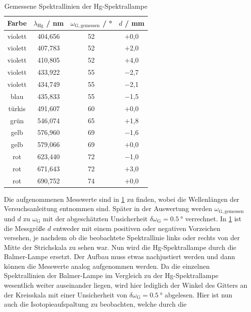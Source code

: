 \begin{table}[H]
    \centering
    \caption{Gemessene Spektrallinien der Hg-Spektrallampe}
    \begin{tabular}{c|c|c|c}
        Farbe & $\lambda_{\mathrm{Hg}}$ / \unit{\nano \meter} & $\omega_{\mathrm{G,gemessen}}$ / \unit{\degree} & $d$ / \unit{\milli \meter} \\
        \hline
        violett & 404,656 & 52 & $+$0,0 \\
        violett & 407,783 & 52 & $+$2,0 \\
        violett & 410,805 & 52 & $+$4,0 \\
        violett & 433,922 & 55 & $-$2,7 \\
        violett & 434,749 & 55 & $-$2,1 \\
        blau & 435,833 & 55 & $-$1,5 \\
        türkis & 491,607 & 60 & $+$0,0 \\
        grün & 546,074 & 65 & $+$1,8 \\
        gelb & 576,960 & 69 & $-$1,6 \\
        gelb & 579,066 & 69 & $+$0,0 \\
        rot & 623,440 & 72 & $-$1,0 \\
        rot & 671,643 & 72 & $+$3,0 \\
        rot & 690,752 & 74 & $+$0,0
    \end{tabular}\label{tab:spektrallinien_hg}
\end{table} Die aufgenommenen Messwerte sind in \cref{tab:spektrallinien_hg} zu finden, wobei die Wellenlängen der Versuchsanleitung \cite{skript} entnommen sind.
Später in der Auswertung werden $\omega_{\mathrm{G,gemessen}}$ und $d$ zu $\omega_{\mathrm{G}}$ mit der abgeschätzten Unsicherheit $\delta \omega_{\mathrm{G}} = \SI{0,5}{\degree}$ verrechnet.
In \cref{tab:spektrallinien_hg} ist die Messgröße $d$ entweder mit einem positiven oder negativen Vorzeichen versehen, je nachdem ob die beobachtete Spektrallinie links oder rechts
von der Mitte der Strichskala zu sehen war.\newline
\indent Nun wird die Hg-Spektrallampe durch die Balmer-Lampe ersetzt. Der Aufbau muss etwas nachjustiert werden und dann können die Messwerte analog aufgenommen werden.
Da die einzelnen Spektrallinien der Balmer-Lampe im Vergleich zu der Hg-Spektrallampe wesentlich weiter auseinander liegen, wird hier lediglich der Winkel des Gitters
an der Kreisskala mit einer Unsicherheit von $\delta \omega_{\mathrm{G}} = \SI{0,5}{\degree}$ abgelesen. Hier ist nun auch die Isotopieaufspaltung zu beobachten, welche durch die
